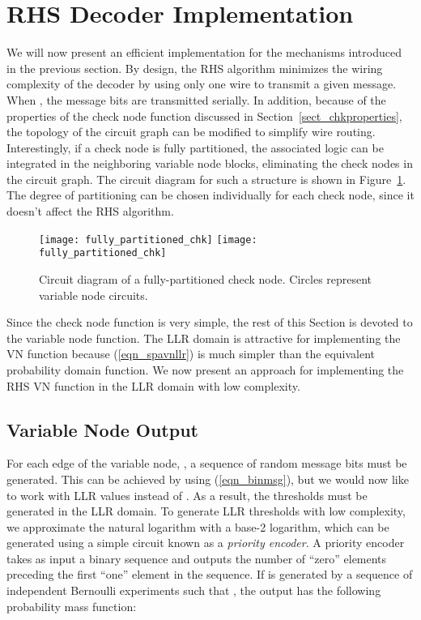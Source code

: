 \documentclass[12pt,journal,twoside,draftcls,onecolumn]{IEEEtran}
\begin{document}
\section{RHS Decoder Implementation}
\label{sect_implementation}

We will now present an efficient implementation for the mechanisms introduced in the previous section.
By design, the RHS algorithm minimizes the wiring complexity of the decoder by using only one wire to transmit a given message. When , the message bits are transmitted serially.
In addition, because of the properties of the check node function discussed in Section~\ref{sect_chkproperties}, the topology of the circuit graph can be modified to simplify wire routing. Interestingly, if a check node is fully partitioned, the associated logic can be integrated in the neighboring variable node blocks, eliminating the check nodes in the circuit graph. The circuit diagram for such a structure is shown in Figure~\ref{fig_fullypartchk}.
The degree of partitioning can be chosen individually for each check node, since it doesn't affect the RHS algorithm.
\begin{figure}[tbp]
\begin{center}
\ifCLASSOPTIONdraftcls
\texttt{[image: fully\_partitioned\_chk]}
\else
\texttt{[image: fully\_partitioned\_chk]}
\fi
\caption{Circuit diagram of a fully-partitioned check node. Circles represent variable node circuits.}
\label{fig_fullypartchk}
\end{center}
\end{figure}
Since the check node function is very simple, the rest of this Section is devoted to the variable node function.
The LLR domain is attractive for implementing the VN function because (\ref{eqn_spavnllr}) is much simpler than the equivalent probability domain function. We now present an approach for implementing the RHS VN function in the LLR domain with low complexity.

	\subsection{Variable Node Output}
	
	For each edge  of the variable node, , a sequence of random message bits  must be generated. This can be achieved by using (\ref{eqn_binmsg}), but we would now like to work with LLR values  instead of . As a result, the thresholds  must be generated in the LLR domain.
	To generate LLR thresholds with low complexity, we approximate the natural logarithm with a base-2 logarithm, which can be generated using a simple circuit known as a \emph{priority encoder}. A priority encoder takes as input a binary sequence  and outputs the number  of ``zero'' elements preceding the first ``one'' element in the sequence. If  is generated by a sequence of independent Bernoulli experiments such that , the output  has the following probability mass function:
	
\end{document}
